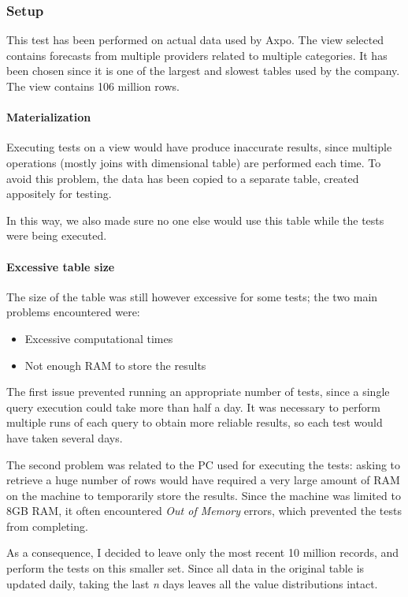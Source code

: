 \subsubsection{Setup}
    This test has been performed on actual data used by Axpo.
    The view selected contains forecasts from multiple providers related to multiple categories.
    It has been chosen since it is one of the largest and slowest tables used by the company.
    The view contains 106 million rows.
    
    \paragraph{Materialization}
        Executing tests on a view would have produce inaccurate results, since multiple operations (mostly joins with dimensional table) are performed each time.
        To avoid this problem, the data has been copied to a separate table, created appositely for testing.
        
        In this way, we also made sure no one else would use this table while the tests were being executed.
        
    \paragraph{Excessive table size}
        The size of the table was still however excessive for some tests; the two main problems encountered were:
        \begin{itemize}
            \item Excessive computational times
            \item Not enough RAM to store the results
        \end{itemize}
        
        The first issue prevented running an appropriate number of tests, since a single query execution could take more than half a day.
        It was necessary to perform multiple runs of each query to obtain more reliable results, so each test would have taken several days.
        
        The second problem was related to the PC used for executing the tests: asking to retrieve a huge number of rows would have required a very large amount of RAM on the machine to temporarily store the results.
        Since the machine was limited to 8GB RAM, it often encountered \textit{Out of Memory} errors, which prevented the tests from completing.
        
        As a consequence, I decided to leave only the most recent 10 million records, and perform the tests on this smaller set.
        Since all data in the original table is updated daily, taking the last \textit{n} days leaves all the value distributions intact.
        
